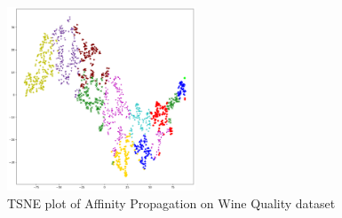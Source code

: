 \begin{figure}[!ht]
	\caption{TSNE plot of Affinity Propagation on Wine Quality dataset}
	\begin{center}
		\includegraphics[width=0.5\textwidth]{images/af_wine6533.png}
	\end{center}
	\label{fig:af_wine1}
\end{figure}























